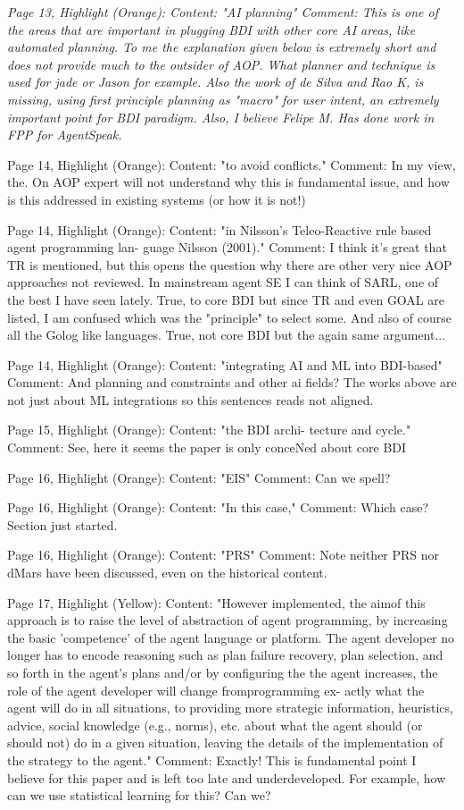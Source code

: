 \documentclass[12pt]{article}
\newenvironment{reviews}{\bigskip\itshape}{\upshape\bigskip}
\begin{document}
\begin{reviews}
Page 13, Highlight (Orange):
Content: "AI planning"
Comment: This is one of the areas that are important in plugging BDI with other core AI areas, like automated planning. To me the explanation given below is extremely short and does not provide much to the outsider of AOP. What planner and technique is used for jade or Jason for example. Also the work of de Silva and Rao K, is missing, using first principle planning as "macro" for user intent, an extremely important point for BDI paradigm. Also, I believe Felipe M. Has done work in FPP for AgentSpeak.

Page 14, Highlight (Orange):
Content: "to avoid conflicts."
Comment: In my view, the. On AOP expert will not understand why this is fundamental issue, and how is this addressed in existing systems (or how it is not!)

Page 14, Highlight (Orange):
Content: "in Nilsson's Teleo-Reactive rule based agent programming lan- guage Nilsson (2001)."
Comment: I think it's great that TR is mentioned, but this opens the question why there are other very nice AOP approaches not reviewed. In mainstream agent SE I can think of SARL, one of the best I have seen lately. True, to core BDI but since TR and even GOAL are listed, I am confused which was the "principle" to select some. And also of course all the Golog like languages. True, not core BDI but the again same argument...

Page 14, Highlight (Orange):
Content: "integrating AI and ML into BDI-based"
Comment: And planning and constraints and other ai fields? The works above are not just about ML integrations so this sentences reads not aligned.

Page 15, Highlight (Orange):
Content: "the BDI archi- tecture and cycle."
Comment: See, here it seems the paper is only conceNed about core BDI

Page 16, Highlight (Orange):
Content: "EIS"
Comment: Can we spell?

Page 16, Highlight (Orange):
Content: "In this case,"
Comment: Which case? Section just started.

Page 16, Highlight (Orange):
Content: "PRS"
Comment: Note neither PRS nor dMars have been discussed, even on the historical content.

Page 17, Highlight (Yellow):
Content: "However implemented, the aimof this approach is to raise the level of abstraction of agent programming, by increasing the basic 'competence' of the agent language or platform. The agent developer no longer has to encode reasoning such as plan failure recovery, plan selection, and so forth in the agent's plans and/or by configuring the the agent increases, the role of the agent developer will change fromprogramming ex- actly what the agent will do in all situations, to providing more strategic information, heuristics, advice, social knowledge (e.g., norms), etc. about what the agent should (or should not) do in a given situation, leaving the details of the implementation of the strategy to the agent."
Comment: Exactly! This is fundamental point I believe for this paper and is left too late and underdeveloped. For example, how can we use statistical learning for this? Can we?


\end{reviews}
\end{document}
